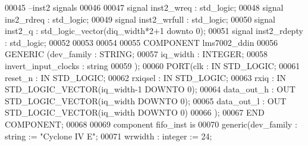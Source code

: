 \begin{DoxyCode}
00045 \textcolor{keyword}{--inst2 signals}
00046 
00047 \textcolor{keywordflow}{signal} \textcolor{vhdlchar}{inst2_wreq}       \textcolor{vhdlchar}{:} \textcolor{comment}{std\_logic};
00048 \textcolor{keywordflow}{signal} \textcolor{vhdlchar}{ins2_rdreq}       \textcolor{vhdlchar}{:} \textcolor{comment}{std\_logic};
00049 \textcolor{keywordflow}{signal} \textcolor{vhdlchar}{inst2_wrfull}     \textcolor{vhdlchar}{:} \textcolor{comment}{std\_logic};
00050 \textcolor{keywordflow}{signal} \textcolor{vhdlchar}{inst2_q}          \textcolor{vhdlchar}{:} \textcolor{comment}{std\_logic\_vector}\textcolor{vhdlchar}{(}\textcolor{vhdlchar}{diq_width}\textcolor{vhdlchar}{*}\textcolor{vhdllogic}{}\textcolor{vhdllogic}{2+1} \textcolor{keywordflow}{downto} \textcolor{vhdllogic}{}\textcolor{vhdllogic}{0}\textcolor{vhdlchar}{)};
00051 \textcolor{keywordflow}{signal} \textcolor{vhdlchar}{inst2_rdepty}     \textcolor{vhdlchar}{:} \textcolor{comment}{std\_logic};
00052 
00053 
00054 
00055 \textcolor{keywordflow}{COMPONENT} lms7002_ddin
00056 \textcolor{keywordflow}{GENERIC} (dev_family                 : \textcolor{comment}{STRING};
00057             iq_width                : \textcolor{comment}{INTEGER};
00058             invert_input_clocks : \textcolor{comment}{string}
00059             );
00060     \textcolor{keywordflow}{PORT}(clk        : \textcolor{keywordflow}{IN} \textcolor{comment}{STD\_LOGIC};
00061          reset_n    : \textcolor{keywordflow}{IN} \textcolor{comment}{STD\_LOGIC};
00062          rxiqsel        : \textcolor{keywordflow}{IN} \textcolor{comment}{STD\_LOGIC};
00063          rxiq       : \textcolor{keywordflow}{IN} \textcolor{comment}{STD\_LOGIC\_VECTOR}(iq_width\textcolor{vhdlchar}{-}\textcolor{vhdllogic}{}\textcolor{vhdllogic}{1} \textcolor{keywordflow}{DOWNTO} \textcolor{vhdllogic}{}\textcolor{vhdllogic}{0});
00064          data_out_h : \textcolor{keywordflow}{OUT} \textcolor{comment}{STD\_LOGIC\_VECTOR}(iq_width \textcolor{keywordflow}{DOWNTO} \textcolor{vhdllogic}{}\textcolor{vhdllogic}{0});
00065          data_out_l : \textcolor{keywordflow}{OUT} \textcolor{comment}{STD\_LOGIC\_VECTOR}(iq_width \textcolor{keywordflow}{DOWNTO} \textcolor{vhdllogic}{}\textcolor{vhdllogic}{0})
00066     );
00067 \textcolor{keywordflow}{END} \textcolor{keywordflow}{COMPONENT};
00068 
00069  \textcolor{keywordflow}{component} fifo_inst \textcolor{keywordflow}{is}
00070   \textcolor{keywordflow}{generic}(dev_family         : \textcolor{comment}{string}  := \textcolor{keyword}{"Cyclone IV E"};
00071           wrwidth         : \textcolor{comment}{integer} := \textcolor{vhdllogic}{}\textcolor{vhdllogic}{24};

\end{DoxyCode}
